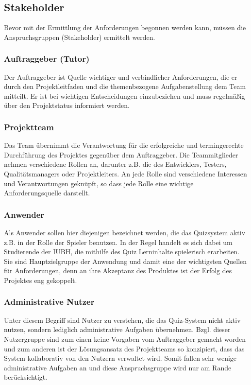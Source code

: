 \documentclass[a4paper,11pt,listof=numbered,glossary=totoc,parskip=half]{scrreprt}
\begin{document}
\subsection{Stakeholder}

Bevor mit der Ermittlung der Anforderungen begonnen werden kann, müssen die Anspruchsgruppen (Stakeholder) ermittelt werden.

\subsubsection{Auftraggeber (Tutor)}

Der Auftraggeber ist Quelle wichtiger und verbindlicher Anforderungen, die er durch den Projektleitfaden und die themenbezogene Aufgabenstellung dem Team mitteilt.
Er ist bei wichtigen Entscheidungen einzubeziehen und muss regelmäßig über den Projektstatus informiert werden.

\subsubsection{Projektteam}

Das Team übernimmt die Verantwortung für die erfolgreiche und termingerechte Durchführung des Projektes gegenüber dem Auftraggeber.
Die Teammitglieder nehmen verschiedene Rollen an, darunter z.B. die des Entwicklers, Testers, Qualitätsmanagers oder Projektleiters. 
An jede Rolle sind verschiedene Interessen und Verantwortungen geknüpft, so dass jede Rolle eine wichtige Anforderungsquelle darstellt.

\subsubsection{Anwender}

Als Anwender sollen hier diejenigen bezeichnet werden, die das Quizsystem aktiv z.B. in der Rolle der Spieler benutzen. In der Regel handelt es sich dabei um Studierende der IUBH, die mithilfe des Quiz Lerninhalte spielerisch erarbeiten. 
Sie sind Hauptzielgruppe der Anwendung und damit eine der wichtigsten Quellen für Anforderungen, denn an ihre Akzeptanz des Produktes ist der Erfolg des Projektes eng gekoppelt. 

\subsubsection{Administrative Nutzer}

Unter diesem Begriff sind Nutzer zu verstehen, die das Quiz-System nicht aktiv nutzen, sondern lediglich administrative Aufgaben übernehmen.
Bzgl. dieser Nutzergruppe sind zum einen keine Vorgaben vom Auftraggeber gemacht worden und zum anderen ist der Lösungsansatz des Projektteams so konzipiert, dass das System kollaborativ von den Nutzern verwaltet wird. 
Somit fallen sehr wenige administrative Aufgaben an und diese Anspruchsgruppe wird nur am Rande berücksichtigt.
\end{document}

